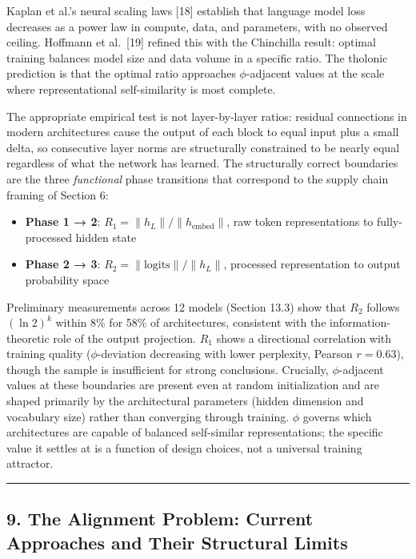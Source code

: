 \documentclass[
  11pt,
  letterpaper,
]{article}
\providecommand{\tightlist}{%
  \setlength{\itemsep}{0pt}\setlength{\parskip}{0pt}}
\begin{document}
Kaplan et al.'s neural scaling laws {[}18{]} establish that language
model loss decreases as a power law in compute, data, and parameters,
with no observed ceiling. Hoffmann et al.~{[}19{]} refined this with the
Chinchilla result: optimal training balances model size and data volume
in a specific ratio. The tholonic prediction is that the optimal ratio
approaches \(\phi\)-adjacent values at the scale where representational
self-similarity is most complete.

The appropriate empirical test is not layer-by-layer ratios: residual
connections in modern architectures cause the output of each block to
equal input plus a small delta, so consecutive layer norms are
structurally constrained to be nearly equal regardless of what the
network has learned. The structurally correct boundaries are the three
\emph{functional} phase transitions that correspond to the supply chain
framing of Section 6:

\begin{itemize}
\tightlist
\item
  \textbf{Phase 1 → 2}: \(R_1 = \|h_L\| / \|h_{\text{embed}}\|\), raw
  token representations to fully-processed hidden state
\item
  \textbf{Phase 2 → 3}: \(R_2 = \|\text{logits}\| / \|h_L\|\), processed
  representation to output probability space
\end{itemize}

Preliminary measurements across 12 models (Section 13.3) show that
\(R_2\) follows \((\ln 2)^k\) within 8\% for 58\% of architectures,
consistent with the information-theoretic role of the output projection.
\(R_1\) shows a directional correlation with training quality
(\(\phi\)-deviation decreasing with lower perplexity, Pearson
\(r = 0.63\)), though the sample is insufficient for strong conclusions.
Crucially, \(\phi\)-adjacent values at these boundaries are present even
at random initialization and are shaped primarily by the architectural
parameters (hidden dimension and vocabulary size) rather than converging
through training. \(\phi\) governs which architectures are capable of
balanced self-similar representations; the specific value it settles at
is a function of design choices, not a universal training attractor.

\begin{center}\rule{0.5\linewidth}{0.5pt}\end{center}

\subsection{9. The Alignment Problem: Current Approaches and Their
Structural
Limits}\label{the-alignment-problem-current-approaches-and-their-structural-limits}
\end{document}
